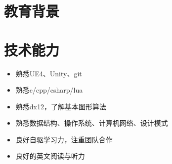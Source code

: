 \documentclass{resume}
\begin{document}



\section{教育背景}

\section{技术能力}
\begin{itemize}[parsep=0.2ex]
  \item 熟悉UE4、Unity、git
  \item 熟悉c/cpp/csharp/lua
  \item 熟悉dx12，了解基本图形算法
  \item 熟悉数据结构、操作系统、计算机网络、设计模式
  \item 良好自驱学习力，注重团队合作
  \item 良好的英文阅读与听力
\end{itemize}

\end{document}
